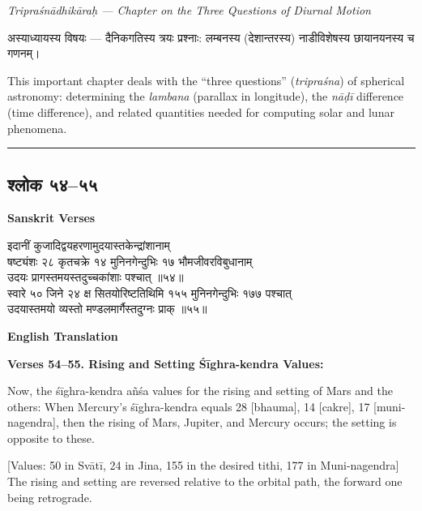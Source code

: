 \documentclass[11pt,a4paper]{article}
\newcommand{\longline}{\noindent\rule{\textwidth}{0.4pt}}
\newcommand{\dev}[1]{{\devanagarifont #1}}
\newcommand{\sectsep}{\par\vspace{0.8em}\longline\vspace{0.8em}}
\begin{document}
\begin{center}
\textit{Tripra\'sn\=adhik\=ara\d{h} --- Chapter on the Three Questions of Diurnal Motion}
\end{center}

\begin{minipage}[t]{0.48\textwidth}
\small\devanagarifont
अस्याध्यायस्य विषयः --- दैनिकगतिस्य त्रयः प्रश्नाः: लम्बनस्य (देशान्तरस्य) नाडीविशेषस्य छायानयनस्य च गणनम्।
\end{minipage}%
\hfill
\begin{minipage}[t]{0.48\textwidth}
\small
This important chapter deals with the ``three questions'' (\textit{tripra\'sna}) of spherical astronomy: determining the \textit{lambana} (parallax in longitude), the \textit{n\=a\d{d}\=i} difference (time difference), and related quantities needed for computing solar and lunar phenomena.
\end{minipage}

\sectsep

\subsection{\dev{श्लोक ५४--५५}}

\begin{minipage}[t]{0.48\textwidth}
\textbf{\small Sanskrit Verses}

\small\devanagarifont
इदानीं कुजादिद्वयहरणामुदयास्तकेन्‍द्रांशानाम्\\
षष्ट्यंशः २८ कृतचक्रे १४ मुनिनगेन्‍दुभिः १७ भौमजीवरविबुधानाम्\\
उदयः प्रागस्तमयस्तदुच्चकांशाः पश्चात् ॥५४॥\\[0.5em]
स्वारे ५० जिने २४ क्ष सितयोरिष्टतिथिमि १५५ मुनिनगेन्‍दुभिः १७७ पश्चात्\\
उदयास्तमयो व्यस्तो मण्डलमार्गैस्तदुग्नः प्राक् ॥५५॥
\end{minipage}%
\hfill
\begin{minipage}[t]{0.48\textwidth}
\textbf{\small English Translation}

\textbf{Verses 54--55. Rising and Setting \'S\=ighra-kendra Values:}

Now, the \'s\=ighra-kendra a\~n\'sa values for the rising and setting of Mars and the others: When Mercury's \'s\=ighra-kendra equals 28 [bhauma], 14 [cakre], 17 [muni-nagendra], then the rising of Mars, Jupiter, and Mercury occurs; the setting is opposite to these.

[Values: 50 in Sv\=at\=i, 24 in Jina, 155 in the desired tithi, 177 in Muni-nagendra] The rising and setting are reversed relative to the orbital path, the forward one being retrograde.
\end{minipage}
\end{document}

